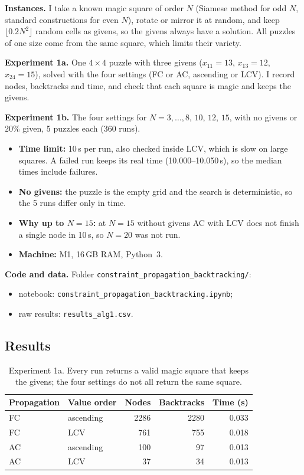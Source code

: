 \documentclass[11pt,a4paper]{article}
\begin{document}
\textbf{Instances.} I take a known magic square of order $N$ (Siamese
method for odd $N$, standard constructions for even $N$), rotate or
mirror it at random, and keep $\lfloor 0.2N^2\rfloor$ random cells as
givens, so the givens always have a solution. All puzzles of one size
come from the same square, which limits their variety.

\textbf{Experiment 1a.} One $4\times4$ puzzle with three givens
($x_{11}=13$, $x_{13}=12$, $x_{24}=15$), solved with the four settings
(FC or AC, ascending or LCV). I record nodes, backtracks and time, and
check that each square is magic and keeps the givens.

\textbf{Experiment 1b.} The four settings for $N=3,\dots,8$, $10$, $12$,
$15$, with no givens or $20\%$ given, 5 puzzles each (360 runs).
\begin{itemize}[nosep]
  \item \textbf{Time limit:} 10\,s per run, also checked inside LCV, which
        is slow on large squares. A failed run keeps its real time
        (10.000--10.050\,s), so the median times include failures.
  \item \textbf{No givens:} the puzzle is the empty grid and the search is
        deterministic, so the 5 runs differ only in time.
  \item \textbf{Why up to $N=15$:} at $N=15$ without givens AC with LCV
        does not finish a single node in 10\,s, so $N=20$ was not run.
  \item \textbf{Machine:} M1, 16\,GB RAM, Python~3.
\end{itemize}

\textbf{Code and data.} Folder
\nolinkurl{constraint_propagation_backtracking/}:
\begin{itemize}[nosep]
  \item notebook: \nolinkurl{constraint_propagation_backtracking.ipynb};
  \item raw results: \nolinkurl{results_alg1.csv}.
\end{itemize}

\subsection{Results}

\begin{table}[H]
\centering
\begin{tabular}{@{}llrrr@{}}
\toprule
Propagation & Value order & Nodes & Backtracks & Time (s) \\
\midrule
FC & ascending & 2286 & 2280 & 0.033 \\
FC & LCV & 761 & 755 & 0.018 \\
AC & ascending & 100 & 97 & 0.013 \\
AC & LCV & 37 & 34 & 0.013 \\
\bottomrule
\end{tabular}
\caption{Experiment 1a. Every run returns a valid magic square that
keeps the givens; the four settings do not all return the same square.}
\label{tab:alg1demo}
\end{table}
\end{document}
